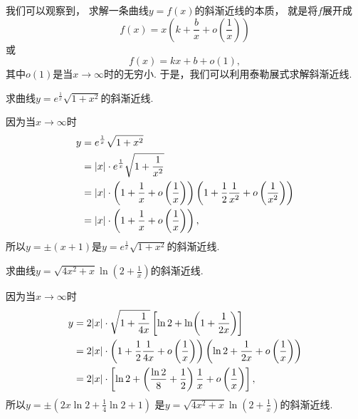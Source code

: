 我们可以观察到，
求解一条曲线\(y = f(x)\)的斜渐近线的本质，
就是将\(f\)展开成\begin{equation*}
	f(x) = x \left( k + \frac{b}{x} + o\left(\frac1x\right) \right)
\end{equation*}或\begin{equation*}
	f(x) = k x + b + o(1),
\end{equation*}
其中\(o(1)\)是当\(x\to\infty\)时的无穷小.
于是，我们可以利用泰勒展式求解斜渐近线.

\begin{example}
求曲线\(y = e^{\frac1x} \sqrt{1+x^2}\)的斜渐近线.
\begin{solution}
因为当\(x\to\infty\)时\begin{align*}
	y &= e^{\frac1x} \sqrt{1+x^2} \\
	&= \abs{x} \cdot e^{\frac1x} \sqrt{1+\frac1{x^2}} \\
	&= \abs{x} \cdot \left( 1 + \frac1x + o\left(\frac1x\right) \right)
	\left( 1 + \frac12 \frac1{x^2} + o\left(\frac1{x^2}\right) \right) \\
	&= \abs{x} \cdot \left( 1 + \frac1x + o\left(\frac1x\right) \right),
\end{align*}
所以\(y = \pm(x + 1)\)是\(y = e^{\frac1x} \sqrt{1+x^2}\)的斜渐近线.
\end{solution}
\end{example}
\begin{example}
求曲线\(y = \sqrt{4x^2+x} \ln(2+\frac1x)\)的斜渐近线.
\begin{solution}
因为当\(x\to\infty\)时\begin{align*}
	y &= 2 \abs{x} \cdot \sqrt{1 + \frac1{4x}} \left[ \ln2 + \ln(1+\frac1{2x}) \right] \\
	&= 2 \abs{x} \cdot \left( 1 + \frac12 \frac1{4x} + o\left(\frac1x\right) \right)
	\left( \ln 2 + \frac1{2x} + o\left(\frac1x\right) \right) \\
	&= 2 \abs{x} \cdot \left[ \ln2 + \left( \frac{\ln2}8 + \frac12 \right) \frac1x + o\left(\frac1x\right) \right],
\end{align*}
所以\(y = \pm\left( 2x\ln2 + \frac14 \ln2 + 1 \right)\)
是\(y = \sqrt{4x^2+x} \ln(2+\frac1x)\)的斜渐近线.
\end{solution}
\end{example}
